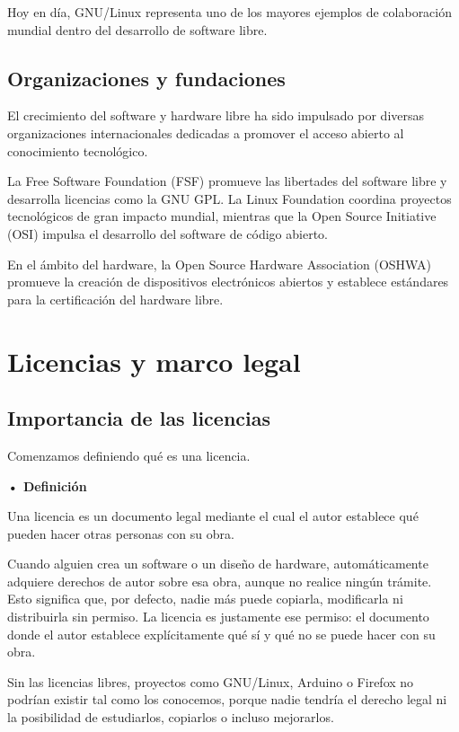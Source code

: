 \documentclass[12pt]{article}
\begin{document}
	Hoy en día, GNU/Linux representa uno de los mayores ejemplos de colaboración mundial dentro del desarrollo de software libre.
	
	\subsection{Organizaciones y fundaciones}
	
	El crecimiento del software y hardware libre ha sido impulsado por diversas organizaciones internacionales dedicadas a promover el acceso abierto al conocimiento tecnológico.
	
	La Free Software Foundation (FSF) promueve las libertades del software libre y desarrolla licencias como la GNU GPL. La Linux Foundation coordina proyectos tecnológicos de gran impacto mundial, mientras que la Open Source Initiative (OSI) impulsa el desarrollo del software de código abierto.
	
	En el ámbito del hardware, la Open Source Hardware Association (OSHWA) promueve la creación de dispositivos electrónicos abiertos y establece estándares para la certificación del hardware libre.

	\section{Licencias y marco legal}
	\subsection{Importancia de las licencias}

    Comenzamos definiendo qué es una licencia.

    \smallskip

    \hspace*{\parindent}\textbf{• Definición}

    Una licencia es un documento legal mediante el cual el autor establece qué pueden hacer otras personas con su obra.

    Cuando alguien crea un software o un diseño de hardware, automáticamente adquiere derechos de autor sobre esa obra, aunque no realice ningún trámite. Esto significa que, por defecto, nadie más puede copiarla, modificarla ni distribuirla sin permiso. La licencia es justamente ese permiso: el documento donde el autor establece explícitamente qué sí y qué no se puede hacer con su obra.

    Sin las licencias libres, proyectos como GNU/Linux, Arduino o Firefox no podrían existir tal como los conocemos, porque nadie tendría el derecho legal ni la posibilidad de estudiarlos, copiarlos o incluso mejorarlos.
\end{document}
